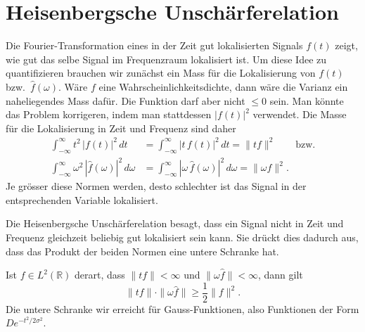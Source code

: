 %
%
%
\section{Heisenbergsche Unschärferelation
\label{section:heisenberg}}
Die Fourier-Transformation eines in der Zeit gut lokalisierten
Signals $f(t)$ zeigt, wie gut das selbe Signal im Frequenzraum
lokalisiert ist.
Um diese Idee zu quantifizieren brauchen wir zunächst ein Mass für
die Lokalisierung von $f(t)$ bzw.~$\hat{f}(\omega)$.
Wäre $f$ eine Wahrscheinlichkeitsdichte, dann wäre die Varianz ein
naheliegendes Mass dafür.
Die Funktion darf aber nicht $\le 0$ sein. Man könnte das Problem korrigeren, indem man stattdessen $|f(t)|^2$ verwendet.
Die Masse für die Lokalisierung in Zeit und Frequenz sind daher
\begin{align*}
\int_{-\infty}^\infty
t^2 \, |f(t)|^2\,dt
&=
\int_{-\infty}^\infty
|t\,f(t)|^2\,dt
=
\|tf\|^2
\qquad\text{bzw.}
\\
\int_{-\infty}^\infty
\omega^2\,|\hat{f}(\omega)|^2\,d\omega
&=
\int_{-\infty}^\infty
|\omega\,\hat{f}(\omega)|^2\,d\omega
=
\|\omega \hat{f}\|^2.
\end{align*}
Je grösser diese Normen werden, desto schlechter ist das Signal in der
entsprechenden Variable lokalisiert.

Die Heisenbergsche Unschärferelation besagt, dass ein Signal nicht
in Zeit und Frequenz gleichzeit beliebig gut lokalisiert sein kann.
Sie drückt dies dadurch aus, dass das Produkt der beiden Normen 
eine untere Schranke hat.

\begin{satz}[Heisenberg]
\label{satz:heisenberg}
Ist $f\in L^2(\mathbb R)$ derart, dass 
$\|tf\|<\infty$ und $\|\omega\hat{f}\|<\infty$, dann gilt
\begin{equation}
\| tf \| \cdot \| \omega \hat{f}\| \ge \frac12\| f\|^2.
\label{heisenberg:gleichung}
\end{equation}
Die untere Schranke wir erreicht für Gauss-Funktionen, also Funktionen
der Form $De^{-t^2/2\sigma^2}$.
\end{satz}

